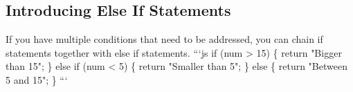 \documentclass{article}%
\begin{document}
%
\subsection{Introducing Else If Statements}%
\label{subsec:IntroducingElseIfStatements}%
If you have multiple conditions that need to be addressed, you can chain if statements together with else if statements.\newline%
```js\newline%
if (num > 15) \{\newline%
  return "Bigger than 15";\newline%
\} else if (num < 5) \{\newline%
  return "Smaller than 5";\newline%
\} else \{\newline%
  return "Between 5 and 15";\newline%
\}\newline%
```\newline%

%
\end{document}

